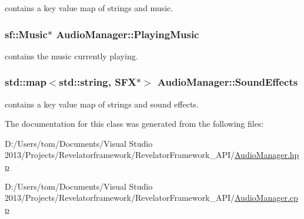 contains a key value map of strings and music. 

\hypertarget{class_audio_manager_a8309e75d7e8ac5ecf53d5d8e787d8dc8}{
\subsubsection[{Playing\-Music}]{\setlength{\rightskip}{0pt plus 5cm}sf\-::\-Music$\ast$ Audio\-Manager\-::\-Playing\-Music\hspace{0.3cm}{\ttfamily [private]}}}\label{class_audio_manager_a8309e75d7e8ac5ecf53d5d8e787d8dc8}


contains the music currently playing. 

\hypertarget{class_audio_manager_a3dcd808b32f86411be40485188f6a917}{
\subsubsection[{Sound\-Effects}]{\setlength{\rightskip}{0pt plus 5cm}std\-::map$<$std\-::string, {\bf S\-F\-X}$\ast$$>$ Audio\-Manager\-::\-Sound\-Effects\hspace{0.3cm}{\ttfamily [private]}}}\label{class_audio_manager_a3dcd808b32f86411be40485188f6a917}


contains a key value map of strings and sound effects. 



The documentation for this class was generated from the following files\-:\begin{DoxyCompactItemize}
\item 
D\-:/\-Users/tom/\-Documents/\-Visual Studio 2013/\-Projects/\-Revelatorframework/\-Revelator\-Framework\-\_\-\-A\-P\-I/\hyperlink{_audio_manager_8hpp}{Audio\-Manager.\-hpp}\item 
D\-:/\-Users/tom/\-Documents/\-Visual Studio 2013/\-Projects/\-Revelatorframework/\-Revelator\-Framework\-\_\-\-A\-P\-I/\hyperlink{_audio_manager_8cpp}{Audio\-Manager.\-cpp}\end{DoxyCompactItemize}
